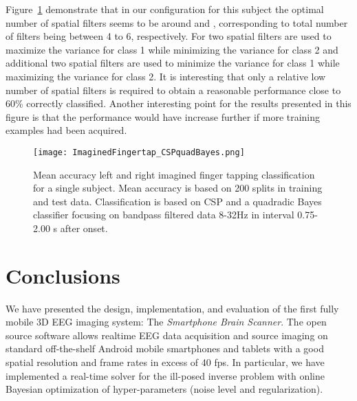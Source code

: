 \documentclass[10pt]{article}
\begin{document}
\begin{center}
{Figure~\ref{figure_imagfingertap_classification} demonstrate that in our configuration for this subject the optimal number of spatial filters seems to be around  and , corresponding to total number of filters being between 4 to 6, respectively. For  two spatial filters are used to maximize the variance for class 1 while minimizing the variance for class 2 and additional two spatial filters are used to minimize the variance for class 1 while maximizing the variance for class 2. It is interesting that only a relative low number of spatial filters is required to obtain a reasonable performance close to 60\%  correctly classified. Another interesting point for the results presented in this figure is that the performance would have increase further if more training examples had been acquired.
\begin{figure}[!t]
\centering
\texttt{[image: ImaginedFingertap\_CSPquadBayes.png]}
\caption{Mean accuracy left and right imagined finger tapping classification for a single subject. Mean accuracy is based on 200 splits in training and test data.
Classification is based on CSP and a quadradic Bayes classifier focusing on bandpass filtered data 8-32Hz in interval 0.75-2.00 s after onset.}
\label{figure_imagfingertap_classification}
\end{figure}

}\fi


































 \section{Conclusions}

We have presented the design, implementation, and evaluation of the first fully mobile 3D EEG imaging system: The \emph{Smartphone Brain Scanner}. The open source software allows realtime EEG data acquisition and source imaging on standard off-the-shelf Android mobile smartphones and tablets with a good spatial resolution and frame rates in excess of 40 fps. In particular, we have implemented a real-time solver for the ill-posed inverse problem with online Bayesian optimization of hyper-parameters (noise level and regularization).


\end{center}
\end{document}
